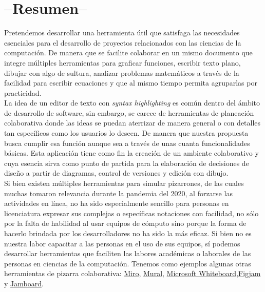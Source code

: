 \documentclass[a4paper, oneside, final]{scrartcl}
\begin{document}


\section{--Resumen--}

Pretendemos desarrollar una herramienta útil que satisfaga las
necesidades esenciales para el desarrollo de proyectos relacionados con las ciencias de la computación. De manera que se facilite colaborar en un mismo documento que integre múltiples herramientas para graficar funciones, escribir texto plano, dibujar con algo de sultura, analizar problemas matemáticos a través de la facilidad para escribir ecuaciones y que al mismo tiempo permita agruparlas por practicidad.\\

La idea de un editor de texto con \textit{syntax highlighting} es común dentro
del ámbito de desarrollo de software, sin embargo, se carece de herramientas de
planeación colaborativa donde las ideas se puedan aterrizar de manera general o
con detalles tan específicos como los usuarios lo deseen. De manera que nuestra propuesta busca cumplir esa función aunque sea a través de unas cuanta funcionalidades básicas. Esta aplicación tiene como fin la creación de un ambiente colaborativo y cuya
esencia sirva como punto de partida para la elaboración de decisiones de diseño
a partir de diagramas, control de versiones y edición con dibujo.\\

Si bien existen múltiples herramientas para simular pizarrones, de las cuales muchas tomaron relevancia durante la pandemia del 2020, al forzarse las actividades en línea, no ha sido especialmente sencillo para personas en licenciatura expresar sus complejas o específicas notaciones con facilidad, no sólo por la falta de habilidad al usar equipos de cómputo sino porque la forma de hacerlo brindada por los desarrolladores no ha sido la más eficaz. Si bien no es nuestra labor capacitar a las personas en el uso de sus equipos, sí podemos desarrollar herramientas que faciliten las labores académicas o laborales de las personas en ciencias de la computación.
Tenemos como ejemplos algunas otras herramientas de pizarra colaborativa: \href{https://miro.com/}{Miro}, \href{https://www.mural.co/}{Mural}, \href{ https://www.microsoft.com/en-us/microsoft-365/microsoft-whiteboard/digital-whiteboard-app}{Microsoft Whiteboard},\href{https://www.figma.com/figjam/}{Figjam} y \href{https://jamboard.google.com}{Jamboard}.
\end{document}
